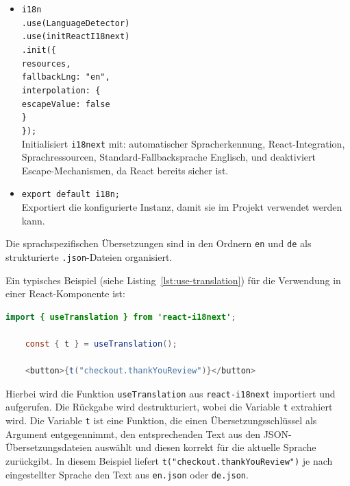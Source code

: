 \begin{itemize}
	\item \texttt{i18n} \\
	\hspace{1em} \texttt{.use(LanguageDetector)} \\
	\hspace{1em} \texttt{.use(initReactI18next)} \\
	\hspace{1em} \texttt{.init(\{} \\
	\hspace{2em} \texttt{resources,} \\
	\hspace{2em} \texttt{fallbackLng: "en",} \\
	\hspace{2em} \texttt{interpolation: \{} \\
	\hspace{3em} \texttt{escapeValue: false} \\
	\hspace{2em} \texttt{\}} \\
	\hspace{1em} \texttt{\});} \\
	Initialisiert \texttt{i18next} mit: automatischer Spracherkennung, React-Integration, Sprachressourcen, Standard-Fallbacksprache Englisch, und deaktiviert Escape-Mechanismen, da React bereits sicher ist.
	
	\item \texttt{export default i18n;} \\
	Exportiert die konfigurierte Instanz, damit sie im Projekt verwendet werden kann.
\end{itemize}

\noindent Die sprachspezifischen Übersetzungen sind in den Ordnern \texttt{en} und \texttt{de} als strukturierte \texttt{.json}-Dateien organisiert.

\noindent Ein typisches Beispiel (siehe Listing~\ref{lst:use-translation}) für die Verwendung in einer React-Komponente ist:

\begin{lstlisting}[language=Java, caption={Beispielhafte Nutzung von \texttt{useTranslation}}, label={lst:use-translation}]
	import { useTranslation } from 'react-i18next';
	
	const { t } = useTranslation();
	
	<button>{t("checkout.thankYouReview")}</button>
\end{lstlisting}

\noindent Hierbei wird die Funktion \texttt{useTranslation} aus \texttt{react-i18next} importiert und aufgerufen. Die Rückgabe wird destrukturiert, wobei die Variable \texttt{t} extrahiert wird. Die Variable \texttt{t} ist eine Funktion, die einen Übersetzungsschlüssel als Argument entgegennimmt, den entsprechenden Text aus den JSON-Übersetzungsdateien auswählt und diesen korrekt für die aktuelle Sprache zurückgibt. In diesem Beispiel liefert \texttt{t("checkout.thankYouReview")} je nach eingestellter Sprache den Text aus \texttt{en.json} oder \texttt{de.json}.

